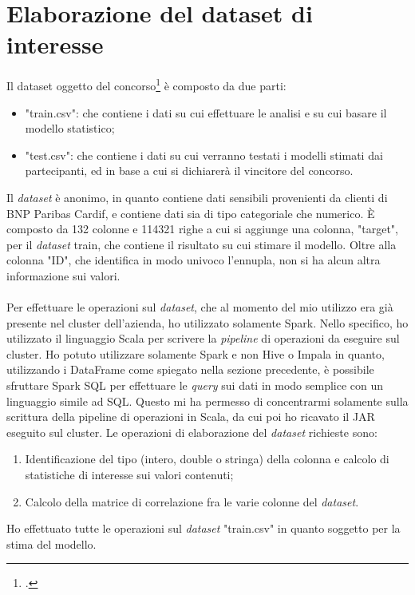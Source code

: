 \section{Elaborazione del dataset di interesse} \label{dataset}
Il dataset oggetto del concorso\footcite{https://www.kaggle.com/c/bnp-paribas-cardif-claims-management/data} è composto da due parti:
\begin{itemize}
	\item "train.csv": che contiene i dati su cui effettuare le analisi e su cui basare il modello statistico;
	\item "test.csv": che contiene i dati su cui verranno testati i modelli stimati dai partecipanti, ed in base a cui si dichiarerà il vincitore del concorso.
\end{itemize}
Il \textit{dataset} è anonimo, in quanto contiene dati sensibili provenienti da clienti di BNP Paribas Cardif, e contiene dati sia di tipo categoriale che numerico.  È composto da 132 colonne e 114321 righe a cui si aggiunge una colonna, "target", per il \textit{dataset} train, che contiene il risultato su cui stimare il modello. Oltre alla colonna "ID", che identifica in modo univoco l'ennupla, non si ha alcun altra informazione sui valori.\\\\
Per effettuare le operazioni sul \textit{dataset}, che al momento del mio utilizzo era già presente nel \gls{cluster} dell'azienda, ho utilizzato solamente Spark. Nello specifico, ho utilizzato il linguaggio Scala per scrivere la \textit{pipeline} di operazioni da eseguire sul \gls{cluster}. Ho potuto utilizzare solamente Spark e non Hive o Impala in quanto, utilizzando i DataFrame come spiegato nella sezione precedente, è possibile sfruttare Spark SQL per effettuare le \textit{query} sui dati in modo semplice con un linguaggio simile ad SQL.
Questo mi ha permesso di concentrarmi solamente sulla scrittura della pipeline di operazioni in Scala, da cui poi ho ricavato il \gls{JAR} eseguito sul \gls{cluster}.
Le operazioni di elaborazione del \textit{dataset} richieste sono:
\begin{enumerate}
	\item Identificazione del tipo (intero, double o stringa) della colonna e calcolo di statistiche di interesse sui valori contenuti;
	\item Calcolo della matrice di correlazione fra le varie colonne del \textit{dataset}.
\end{enumerate}
Ho effettuato tutte le operazioni sul \textit{dataset} "train.csv" in quanto soggetto per la stima del modello.

